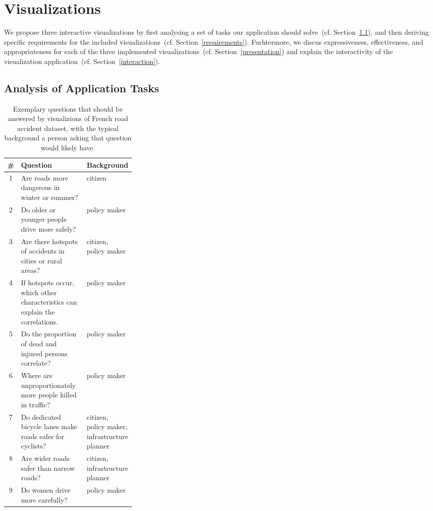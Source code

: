 \section{Visualizations}
\label{visualizations}
We propose three interactive visualizations by first analysing a set of tasks our application should solve~(cf. Section~\ref{tasks}), and then deriving specific requirements for the included visualizations~(cf. Section~\ref{requirements}). Furhtermore, we discus expressiveness, effectiveness, and appropriateness for each of the three implemented visualizations~(cf. Section~\ref{presentation}) and explain the interactivity of the visualization application~(cf. Section~\ref{interaction}).

\subsection{Analysis of Application Tasks}
\label{tasks}
\begin{table}
    \caption{Exemplary questions that should be answered by visualizions of French road accident dataset, with the typical background a person asking that question would likely have.}
    \label{table-questions}
    \begin{tabularx}{\linewidth}{cXp{0.3\linewidth}}
        \toprule
        \textbf{\#} & \textbf{Question} & \textbf{Background} \\
        \midrule
        1 & Are roads more dangerous in winter or summer? & citizen \\
        2 & Do older or younger people drive more safely? & policy maker \\
        3 & Are there hotspots of accidents in cities or rural areas? & citizen, policy maker \\
        4 & If hotspots occur, which other characteristics can explain the correlations. & policy maker \\
        5 & Do the proportion of dead and injured persons correlate? & policy maker \\
        6 & Where are unproportionately more people killed in traffic? & policy maker \\
        7 & Do dedicated bicycle lanes make roads safer for cyclists? & citizen, policy maker, infrastructure planner \\
        8 & Are wider roads safer than narrow roads? & citizen, infrastructure planner \\
        9 & Do women drive more carefully? & policy maker \\
        \bottomrule
    \end{tabularx}
\end{table}
